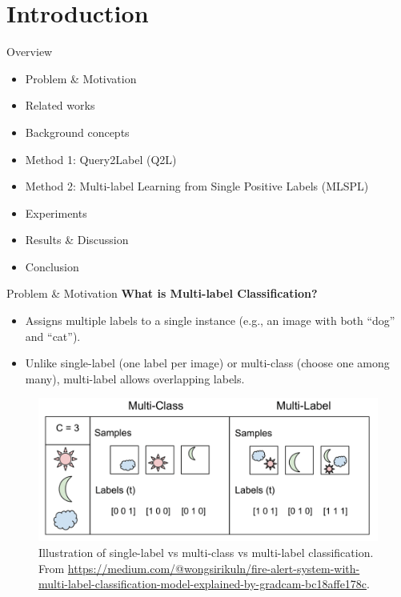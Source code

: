 \section{Introduction}

\begin{frame}{Overview}
  \begin{itemize}
    \item Problem \& Motivation
    \item Related works
    \item Background concepts
    \item Method 1: Query2Label (Q2L)
    \item Method 2: Multi-label Learning from Single Positive Labels (MLSPL)
    \item Experiments 
    \item Results \& Discussion
    \item Conclusion
  \end{itemize}
\end{frame}

\begin{frame}{Problem \& Motivation}
    \textbf{What is Multi-label Classification?}
  \begin{itemize}
    \item Assigns multiple labels to a single instance (e.g., an image with both “dog” and “cat”).
    \item  Unlike single-label (one label per image) or multi-class (choose one among many), multi-label allows overlapping labels.
  \end{itemize}

      \vfill
    \begin{figure}[b]
        \centering
        \includegraphics[width=0.8\linewidth]{Images/mlc.png}
        \caption*{\tiny Illustration of single-label vs multi-class vs multi-label classification. 
        From \url{https://medium.com/@wongsirikuln/fire-alert-system-with-multi-label-classification-model-explained-by-gradcam-bc18affe178c}.}
    \end{figure}
\end{frame}

